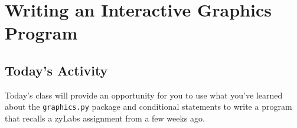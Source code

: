 
\chapter{Writing an Interactive Graphics Program}
\label{day:interactive-graphics}


\minitoc

\section{Today's Activity}

Today's class will provide an opportunity for you to use what you've learned about the \texttt{graphics.py} package and conditional statements to write a program that recalls a zyLabs assignment from a few weeks ago.